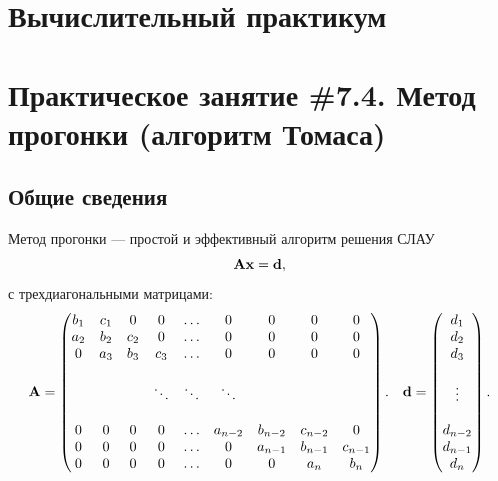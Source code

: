 \documentclass[12pt]{article}
\begin{document}
    \begin{flushright}
    \end{flushright}
    \begin{flushright}
    \end{flushright}
    \section*{Вычислительный практикум}
    \section*{Практическое занятие \#7.4. Метод прогонки (алгоритм Томаса)}

    \subsection*{Общие сведения}

    Метод прогонки --- простой и эффективный алгоритм решения СЛАУ
    \begin{equation}
        \bold{A}\bold{x}=\bold{d},\label{f1}
    \end{equation}
    с трехдиагональными матрицами:
    \begin{equation}
        \bold{A}=
        \begin{pmatrix}
        b_{1}&c_{1}&0&0&\ldots&0&0&0&0\\
        a_{2}&b_{2}&c_{2}&0&\ldots&0&0&0&0\\
        0&a_{3}&b_{3}&c_{3}&\ldots &0&0&0&0 \\
        &\\
        &&&\ddots&\ddots&\ddots&\\
        &\\
        0&0&0&0&\ldots & a_{n-2} &b_{n-2} & c_{n-2} & 0\\
        0&0&0&0&\ldots & 0 & a_{n-1} & b_{n-1} & c_{n-1}\\
        0&0&0&0&\ldots & 0 & 0 & a_{n}&b_{n}
        \end{pmatrix}.\quad
        \bold{d}=
        \begin{pmatrix}
            d_1 \\
            d_2 \\
            d_3 \\
            \\
            \vdots \\
            \\
            d_{n-2} \\
            d_{n-1} \\
            d_{n}
        \end{pmatrix}.
    \end{equation}
\end{document}
